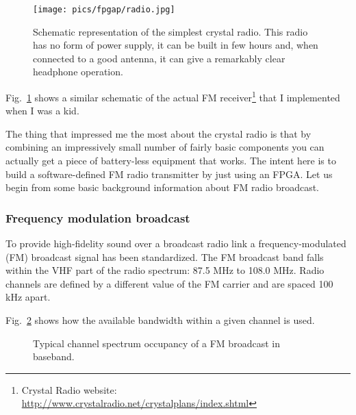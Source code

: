 \documentclass[13pt]{extreport}
\begin{document}
\begin{figure}[!b]
    \centering
	\texttt{[image: pics/fpgap/radio.jpg]}
	\caption{Schematic representation of the simplest crystal radio. This radio has no form of power supply, it can be built in few hours and, when connected to a good antenna, it can give a remarkably clear headphone operation.}
	\label{radio}
\end{figure}

Fig.~\ref{radio} shows a similar schematic of the actual FM receiver\footnote{Crystal Radio website: \scriptsize\url{http://www.crystalradio.net/crystalplans/index.shtml}} that I implemented when I was a kid.

The thing that impressed me the most about the crystal radio is that by combining an impressively small number of fairly basic components you can actually get a piece of battery-less equipment that works. The intent here is to build a software-defined FM radio transmitter by just using an FPGA. Let us begin from some basic background information about FM radio broadcast.

\subsubsection{Frequency modulation broadcast}

To provide high-fidelity sound over a broadcast radio link a frequency-modulated (FM) broadcast signal has been standardized. The FM broadcast band falls within the VHF part of the radio spectrum: 87.5 MHz to 108.0 MHz. Radio channels are defined by a different value of the FM carrier and are spaced 100 kHz apart.

Fig.~\ref{fm_band} shows how the available bandwidth within a given channel is used.

\begin{figure}
    \centering
{}
\caption{Typical channel spectrum occupancy of a FM broadcast in baseband.}
\label{fm_band}
\end{figure}
\end{document}
